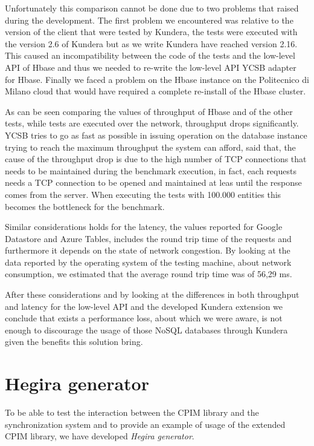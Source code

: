 \noindent Unfortunately this comparison cannot be done due to two problems that raised during the development. The first problem we encountered was relative to the version of the client that were tested by Kundera, the tests were executed with the version 2.6 of Kundera but as we write Kundera have reached version 2.16. This caused an incompatibility between the code of the tests and the low-level API of Hbase and thus we needed to re-write the low-level API YCSB adapter for Hbase.
Finally we faced a problem on the Hbase instance on the Politecnico di Milano cloud that would have required a complete re-install of the Hbase cluster.


\newparagraph As can be seen comparing the values of throughput of Hbase and of the other tests, while tests are executed over the network, throughput drops significantly.
YCSB tries to go as fast as possible in issuing operation on the database instance trying to reach the maximum throughput the system can afford, said that, the cause of the throughput drop is due to the high number of TCP connections that needs to be maintained during the benchmark execution, in fact, each requests needs a TCP connection to be opened and maintained at leas until the response comes from the server. When executing the tests with 100.000 entities this becomes the bottleneck for the benchmark.

\noindent Similar considerations holds for the latency, the values reported for Google Datastore and Azure Tables, includes the round trip time of the requests and furthermore it depends on the state of network congestion. By looking at the data reported by the operating system of the testing machine, about network consumption, we estimated that the average round trip time was of 56,29 ms.

\newparagraph After these considerations and by looking at the differences in both throughput and latency for the low-level API and the developed Kundera extension we conclude that exists a performance loss, about which we were aware, is not enough to discourage the usage of those NoSQL databases through Kundera given the benefits this solution bring.

\section{Hegira generator}
\label{sec:data}
To be able to test the interaction between the CPIM library and the synchronization system and to provide an example of usage of the extended CPIM library, we have developed \textit{Hegira generator}.

